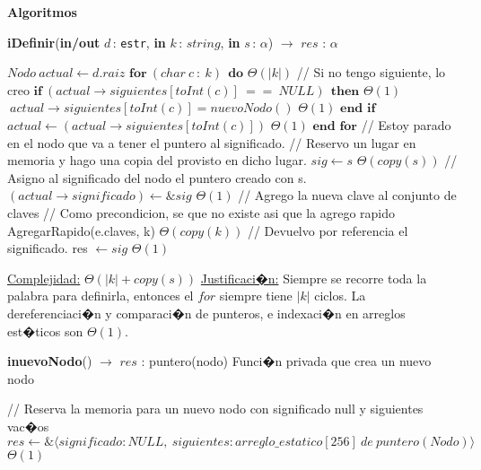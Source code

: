 \documentclass[a4paper,10pt]{article}
\let\TipoVariable=\texttt
\let\ModificadorArgumento=\textbf
\newcommand{\tab}{\hspace*{7mm}}
\newcommand{\ttab}{\tab \tab}
\newcommand{\In}[2]{\ModificadorArgumento{in} \ensuremath{#1}\,: \TipoVariable{#2}\xspace}
\newcommand{\Inout}[2]{\ModificadorArgumento{in/out} \ensuremath{#1}\,: \TipoVariable{#2}\xspace}
\newenvironment{Algoritmos}{%
  \vspace*{2ex}%
  \noindent\textbf{\Large Algoritmos}%
  \vspace*{2ex}%
}{}
\newcommand{\DRef}{\ensuremath{\rightarrow}}
\newcommand{\tuple}[1]{\langle #1 \rangle}
\begin{document}
{\begin{Algoritmos}
    \begin{algorithm}[H]{\textbf{iDefinir}(\Inout{d}{estr}, \In{k}{$string$}, \In{s}{$\alpha$}) $\to$ $res$ : $\alpha$}
      \begin{algorithmic}[1]
          \State $Nodo \ actual \gets d.raiz$
          \State $\textbf{for} \ (char \ c \ : \ k) \ \ \textbf{do}$                                          \Comment $\Theta(|k|)$  
          \State \tab   // Si no tengo siguiente, lo creo
          \State \tab   $\textbf{if} \ (actual \DRef siguientes [toInt(c)] \ == \ NULL) \ \ \textbf{then}$    \Comment $\Theta(1)$
          \State \ttab  $\ actual \DRef siguientes[toInt(c)] = nuevoNodo()$                                   \Comment $\Theta(1)$
          \State \tab   $\textbf{end if}$
          \State \tab   $actual \gets (actual \DRef siguientes [toInt(c)])$                                   \Comment $\Theta(1)$
          \State $\textbf{end for}$  
          \State
          \State // Estoy parado en el nodo que va a tener el puntero al significado.
          \State // Reservo un lugar en memoria y hago una copia del provisto en dicho lugar.
          \State $sig \gets s$                                                                                \Comment $\Theta(copy(s))$
          \State // Asigno al significado del nodo el puntero creado con s.
          \State $(actual \DRef significado) \gets \&sig$                                                     \Comment $\Theta(1)$
          \State // Agrego la nueva clave al conjunto de claves 
          \State // Como precondicion, se que no existe asi que la agrego rapido
          \State AgregarRapido(e.claves, k)                                                                   \Comment $\Theta(copy(k))$
          \State // Devuelvo por referencia el significado.
          \State res $\gets sig$                                                                              \Comment $\Theta(1)$

          \medskip
          \Statex \underline{Complejidad:} $\Theta(|k| + copy(s))$
          \Statex \underline{Justificaci�n:} Siempre se recorre toda la palabra para definirla, entonces el $for$ siempre tiene $|k|$ ciclos. La dereferenciaci�n y comparaci�n de punteros, e indexaci�n en arreglos est�ticos son $\Theta(1)$.
          \end{algorithmic}
    \end{algorithm}
  
    \begin{algorithm}[H]{\textbf{inuevoNodo}() $\to$ $res$ : puntero(nodo)} \Comment Funci�n privada que crea un nuevo nodo
      \begin{algorithmic}[1]
           \State // Reserva la memoria para un nuevo nodo con significado null y siguientes vac�os
           \State $res \gets \& \tuple{significado: NULL, \ siguientes: arreglo\_estatico[256] \ de\ puntero(Nodo)}$ 				\Comment $\Theta(1)$
    

\end{algorithmic}
\end{algorithm}
\end{Algoritmos}}
\end{document}

